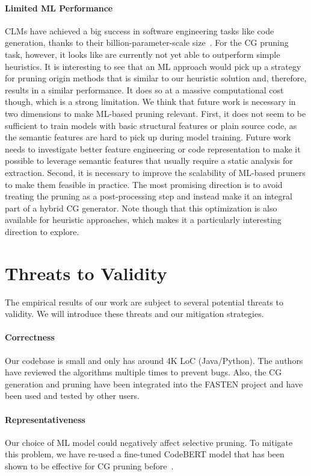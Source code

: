 \paragraph{Limited ML Performance}
CLMs have achieved a big success in software engineering tasks like code generation, thanks to their billion-parameter-scale size~\cite{hou2024large}.
For the CG pruning task, however, it looks like are currently not yet able to outperform simple heuristics.
It is interesting to see that an ML approach would pick up a strategy for pruning origin methods that is similar to our heuristic solution and, therefore, results in a similar performance.
It does so at a massive computational cost though, which is a strong limitation.
We think that future work is necessary in two dimensions to make ML-based pruning relevant.
First, it does not seem to be sufficient to train models with basic structural features or plain source code, as the semantic features are hard to pick up during model training.
Future work needs to investigate better feature engineering or code representation to make it possible to leverage semantic features that usually require a static analysis for extraction.
Second, it is necessary to improve the scalability of ML-based pruners to make them feasible in practice.
The most promising direction is to avoid treating the pruning as a post-processing step and instead make it an integral part of a hybrid CG generator.
Note though that this optimization is also available for heuristic approaches, which makes it a particularly interesting direction to explore.

\section{Threats to Validity}
The empirical results of our work are subject to several potential threats to validity.
We will introduce these threats and our mitigation strategies.

\paragraph{Correctness}
Our codebase is small and only has around 4K LoC (Java/Python).
The authors have reviewed the algorithms multiple times to prevent bugs.
Also, the CG generation and pruning have been integrated into the FASTEN project and have been used and tested by other users.

\paragraph{Representativeness}
Our choice of ML model could negatively affect selective pruning.
To mitigate this problem, we have re-used a fine-tuned CodeBERT model that has been shown to be effective for CG pruning before~\cite{mir2023effect}.

